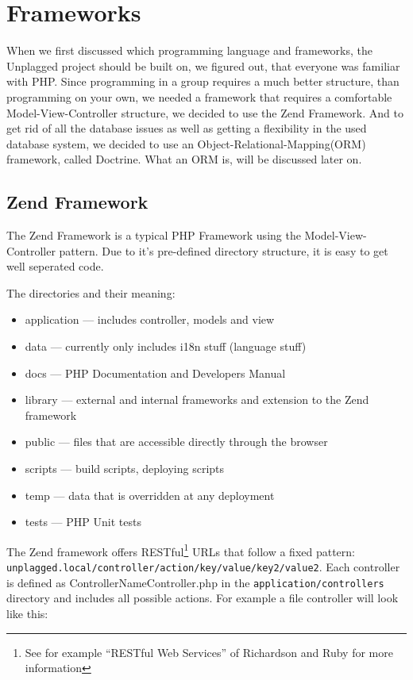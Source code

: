 \section{Frameworks}
When we first discussed which programming language and frameworks, the Unplagged project should be built on, we figured 
out, that everyone was familiar with PHP. Since programming in a group requires a much better structure, than programming 
on your own, we needed a framework that requires a comfortable Model-View-Controller structure, we decided to use the Zend 
Framework. And to get rid of all the database issues as well as getting a flexibility in the used database system, we 
decided to use an Object-Relational-Mapping(ORM) framework, called Doctrine. What an ORM is, will be discussed later on.

\subsection{Zend Framework}
The Zend Framework is a typical PHP Framework using the Model-View-Controller pattern. Due to it's pre-defined directory 
structure, it is easy to get well seperated code. 

The directories and their meaning:
\begin{itemize}
\item application --- includes controller, models and view
\item data --- currently only includes i18n stuff (language stuff)
\item docs --- PHP Documentation and Developers Manual
\item library --- external and internal frameworks and extension to the Zend framework
\item public --- files that are accessible directly through the browser
\item scripts --- build scripts, deploying scripts
\item temp --- data that is overridden at any deployment
\item tests --- PHP Unit tests
\end{itemize}

The Zend framework offers RESTful\footnote{See for example \enquote{RESTful Web Services} of Richardson and Ruby for 
more information} URLs that follow a fixed pattern: \texttt{\nolinkurl{unplagged.local/controller/action/key/value/key2/value2}}. Each 
controller is defined as ControllerNameController.php in the \texttt{application/controllers} directory and includes 
all possible actions. For example a file controller will look like this:

